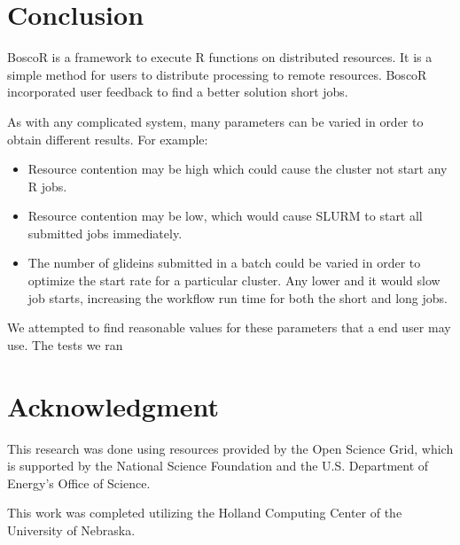 \documentclass[conference]{IEEEtran}
\begin{document}
\section{Conclusion}

BoscoR is a framework to execute R functions on distributed resources.  It is a simple method for users to distribute processing to remote resources.  BoscoR incorporated user feedback to find a better solution short jobs.  

As with any complicated system, many parameters can be varied in order to obtain different results.  For example:
\begin{itemize}
\item Resource contention may be high which could cause the cluster not start any R jobs.
\item Resource contention may be low, which would cause SLURM to start all submitted jobs immediately.
\item The number of glideins submitted in a batch could be varied in order to optimize the start rate for a particular cluster.  Any lower and it would slow job starts, increasing the workflow run time for both the short and long jobs.
\end{itemize}

We attempted to find reasonable values for these parameters that a end user may use.  The tests we ran 








\section*{Acknowledgment}
This research was done using resources provided by the Open Science Grid, which is supported by the National Science Foundation and the U.S. Department of Energy's Office of Science.

This work was completed utilizing the Holland Computing Center of the University of Nebraska.





\end{document}
